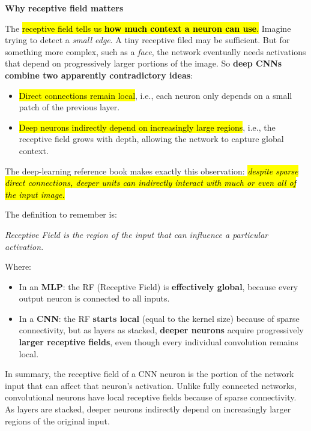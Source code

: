 \highspace
\begin{flushleft}
    \textcolor{Green3}{ \textbf{Why receptive field matters}}
\end{flushleft}
The \hl{receptive field tells us \textbf{how much context a neuron can use}.} Imagine trying to detect a \emph{small edge}. A tiny receptive filed may be sufficient. But for something more complex, such as a \emph{face}, the network eventually needs activations that depend on progressively larger portions of the image. So \textbf{deep CNNs combine two apparently contradictory ideas}:
\begin{itemize}
    \item \hl{Direct connections remain local}, i.e., each neuron only depends on a small patch of the previous layer.
    \item \hl{Deep neurons indirectly depend on increasingly large regions}, i.e., the receptive field grows with depth, allowing the network to capture global context.
\end{itemize}
The deep-learning reference book \cite{Goodfellow-et-al-2016} makes exactly this observation: \hl{\emph{despite sparse direct connections, deeper units can indirectly interact with much or even all of the input image.}}

\highspace
\begin{takeawaysbox}
    The definition to remember is:
    \begin{center}
        \emph{Receptive Field is the region of the input that can influence a particular activation.}
    \end{center}
    Where:
    \begin{itemize}
        \item In an \textbf{MLP}: the RF (Receptive Field) is \textbf{effectively global}, because every output neuron is connected to all inputs.
        \item In a \textbf{CNN}: the RF \textbf{starts local} (equal to the kernel size) because of sparse connectivity, but as layers as stacked, \textbf{deeper neurons} acquire progressively \textbf{larger receptive fields}, even though every individual convolution remains local.
    \end{itemize}
    In summary, the receptive field of a CNN neuron is the portion of the network input that can affect that neuron's activation. Unlike fully connected networks, convolutional neurons have local receptive fields because of sparse connectivity. As layers are stacked, deeper neurons indirectly depend on increasingly larger regions of the original input.
\end{takeawaysbox}

